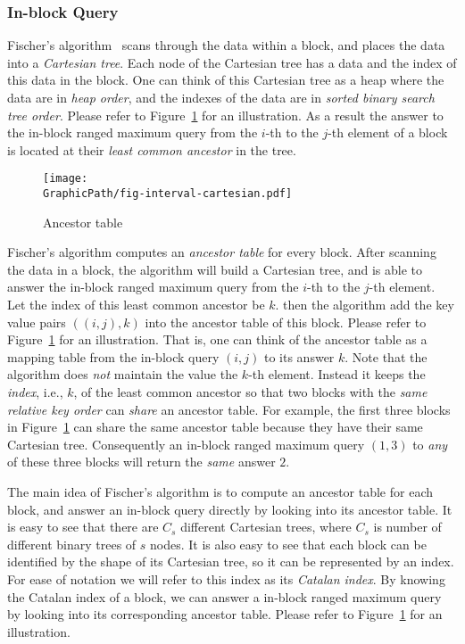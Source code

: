 \subsubsection{In-block Query}

Fischer's algorithm~\cite{Fischer2006TheoreticalAP} scans through the
data within a block, and places the data into a {\em Cartesian tree}.
Each node of the Cartesian tree has a data and the index of this data
in the block.  One can think of this Cartesian tree as a heap where
the data are in {\em heap order}, and the indexes of the data are in
{\em sorted binary search tree order}.  Please refer to
Figure~\ref{fig:ancesstor-cartesian} for an illustration.  As a result
the answer to the in-block ranged maximum query from the $i$-th to the
$j$-th element of a block is located at their {\em least common
  ancestor} in the tree.

\begin{figure}[htbp]   
  \centering
  \texttt{[image: \\GraphicPath/fig-interval-cartesian.pdf]}
  \caption{Ancestor table}
  \label{fig:ancesstor-cartesian}
\end{figure}

Fischer's algorithm computes an {\em ancestor table} for every block.
After scanning the data in a block, the algorithm will build a
Cartesian tree, and is able to answer the in-block ranged maximum
query from the $i$-th to the $j$-th element.  Let the index of this
least common ancestor be $k$. then the algorithm add the key value
pairs $((i, j), k)$ into the ancestor table of this block.  Please
refer to Figure~\ref{fig:ancesstor-cartesian} for an illustration.
That is, one can think of the ancestor table as a mapping table from
the in-block query $(i, j)$ to its answer $k$.  Note that the
algorithm does {\em not} maintain the value the $k$-th element.
Instead it keeps the {\em index}, i.e., $k$, of the least common
ancestor so that two blocks with the {\em same relative key order} can
{\em share} an ancestor table.  For example, the first three blocks in
Figure~\ref{fig:ancesstor-cartesian} can share the same ancestor table
because they have their same Cartesian tree.  Consequently an in-block
ranged maximum query $(1, 3)$ to {\em any} of these three blocks will
return the {\em same} answer $2$.

The main idea of Fischer's algorithm is to compute an ancestor table
for each block, and answer an in-block query directly by looking into
its ancestor table.  It is easy to see that there are $C_s$ different
Cartesian trees, where $C_s$ is number of different binary trees of
$s$ nodes.  It is also easy to see that each block can be identified
by the shape of its Cartesian tree, so it can be represented by an
index.  For ease of notation we will refer to this index as its {\em
  Catalan index}.  By knowing the Catalan index of a block, we can
answer a in-block ranged maximum query by looking into its
corresponding ancestor table.  Please refer to
Figure~\ref{fig:ancesstor-cartesian} for an illustration.

